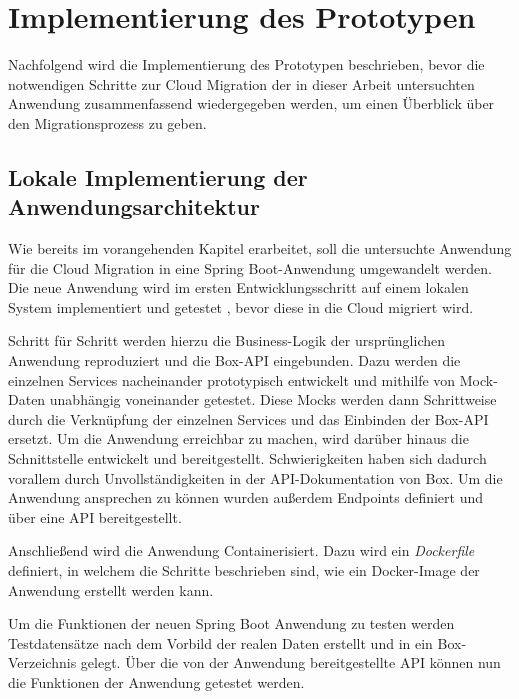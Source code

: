 \chapter{Implementierung des Prototypen}

Nachfolgend wird die Implementierung des Prototypen beschrieben, bevor die notwendigen Schritte zur Cloud Migration der in dieser Arbeit untersuchten Anwendung zusammenfassend wiedergegeben werden, um einen Überblick über den Migrationsprozess zu geben.

\section{Lokale Implementierung der Anwendungsarchitektur}

Wie bereits im vorangehenden Kapitel erarbeitet, soll die untersuchte Anwendung für die Cloud Migration in eine \gls{Spring Boot}-Anwendung umgewandelt werden. Die neue Anwendung wird im ersten Entwicklungsschritt auf einem lokalen System implementiert und getestet , bevor diese in die Cloud migriert wird.

Schritt für Schritt werden hierzu die Business-Logik der ursprünglichen Anwendung reproduziert und die \gls{Box}-\ac{API} eingebunden. Dazu werden die einzelnen Services nacheinander prototypisch entwickelt und mithilfe von Mock-Daten unabhängig voneinander getestet. Diese Mocks werden dann Schrittweise durch die Verknüpfung der einzelnen Services und das Einbinden der \gls{Box}-\ac{API} ersetzt. Um die Anwendung erreichbar zu machen, wird darüber hinaus die Schnittstelle entwickelt und bereitgestellt. Schwierigkeiten haben sich dadurch vorallem durch Unvollständigkeiten in der \ac{API}-Dokumentation von \gls{Box}. Um die Anwendung ansprechen zu können wurden außerdem Endpoints definiert und über eine \ac{API} bereitgestellt.

Anschließend wird die Anwendung Containerisiert. Dazu wird ein \textit{Dockerfile} definiert, in welchem die Schritte beschrieben sind, wie ein Docker-Image der Anwendung erstellt werden kann.

Um die Funktionen der neuen \gls{Spring Boot} Anwendung zu testen werden Testdatensätze nach dem Vorbild der realen Daten erstellt und in ein \gls{Box}-Verzeichnis gelegt. Über die von der Anwendung bereitgestellte \ac{API} können nun die Funktionen der Anwendung getestet werden. \pagebreak

